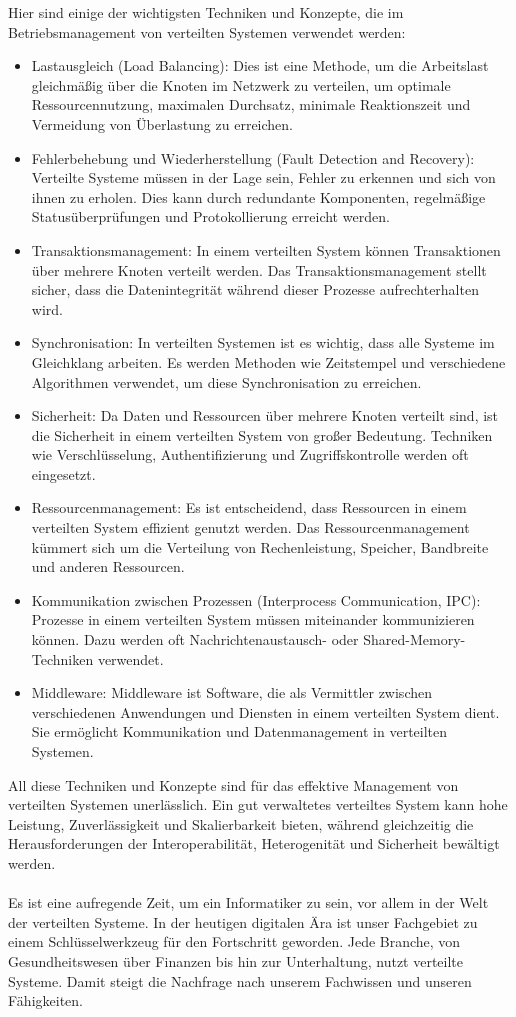 Hier sind einige der wichtigsten Techniken und Konzepte, die im Betriebsmanagement von verteilten Systemen verwendet werden:
\begin{itemize} 
\item Lastausgleich (Load Balancing): Dies ist eine Methode, um die Arbeitslast gleichmäßig über die Knoten im Netzwerk zu verteilen, um optimale Ressourcennutzung, maximalen Durchsatz, minimale Reaktionszeit und Vermeidung von Überlastung zu erreichen.
\item Fehlerbehebung und Wiederherstellung (Fault Detection and Recovery): Verteilte Systeme müssen in der Lage sein, Fehler zu erkennen und sich von ihnen zu erholen. Dies kann durch redundante Komponenten, regelmäßige Statusüberprüfungen und Protokollierung erreicht werden.
\item Transaktionsmanagement: In einem verteilten System können Transaktionen über mehrere Knoten verteilt werden. Das Transaktionsmanagement stellt sicher, dass die Datenintegrität während dieser Prozesse aufrechterhalten wird.
\item Synchronisation: In verteilten Systemen ist es wichtig, dass alle Systeme im Gleichklang arbeiten. Es werden Methoden wie Zeitstempel und verschiedene Algorithmen verwendet, um diese Synchronisation zu erreichen.
\item Sicherheit: Da Daten und Ressourcen über mehrere Knoten verteilt sind, ist die Sicherheit in einem verteilten System von großer Bedeutung. Techniken wie Verschlüsselung, Authentifizierung und Zugriffskontrolle werden oft eingesetzt.
\item Ressourcenmanagement: Es ist entscheidend, dass Ressourcen in einem verteilten System effizient genutzt werden. Das Ressourcenmanagement kümmert sich um die Verteilung von Rechenleistung, Speicher, Bandbreite und anderen Ressourcen.
\item Kommunikation zwischen Prozessen (Interprocess Communication, IPC): Prozesse in einem verteilten System müssen miteinander kommunizieren können. Dazu werden oft Nachrichtenaustausch- oder Shared-Memory-Techniken verwendet.
\item Middleware: Middleware ist Software, die als Vermittler zwischen verschiedenen Anwendungen und Diensten in einem verteilten System dient. Sie ermöglicht Kommunikation und Datenmanagement in verteilten Systemen.
\end{itemize} 
All diese Techniken und Konzepte sind für das effektive Management von verteilten Systemen unerlässlich. Ein gut verwaltetes verteiltes System kann hohe Leistung, Zuverlässigkeit und Skalierbarkeit bieten, während gleichzeitig die Herausforderungen der Interoperabilität, Heterogenität und Sicherheit bewältigt werden.
\\\\
Es ist eine aufregende Zeit, um ein Informatiker zu sein, vor allem in der Welt der verteilten Systeme. In der heutigen digitalen Ära ist unser Fachgebiet zu einem Schlüsselwerkzeug für den Fortschritt geworden. Jede Branche, von Gesundheitswesen über Finanzen bis hin zur Unterhaltung, nutzt verteilte Systeme. Damit steigt die Nachfrage nach unserem Fachwissen und unseren Fähigkeiten.

